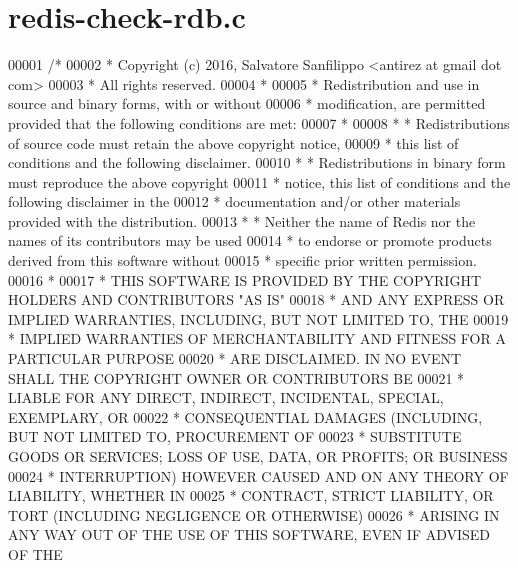 \hypertarget{redis-check-rdb_8c_source}{}\section{redis-\/check-\/rdb.c}
\label{redis-check-rdb_8c_source}

\begin{DoxyCode}
00001 \textcolor{comment}{/*}
00002 \textcolor{comment}{ * Copyright (c) 2016, Salvatore Sanfilippo <antirez at gmail dot com>}
00003 \textcolor{comment}{ * All rights reserved.}
00004 \textcolor{comment}{ *}
00005 \textcolor{comment}{ * Redistribution and use in source and binary forms, with or without}
00006 \textcolor{comment}{ * modification, are permitted provided that the following conditions are met:}
00007 \textcolor{comment}{ *}
00008 \textcolor{comment}{ *   * Redistributions of source code must retain the above copyright notice,}
00009 \textcolor{comment}{ *     this list of conditions and the following disclaimer.}
00010 \textcolor{comment}{ *   * Redistributions in binary form must reproduce the above copyright}
00011 \textcolor{comment}{ *     notice, this list of conditions and the following disclaimer in the}
00012 \textcolor{comment}{ *     documentation and/or other materials provided with the distribution.}
00013 \textcolor{comment}{ *   * Neither the name of Redis nor the names of its contributors may be used}
00014 \textcolor{comment}{ *     to endorse or promote products derived from this software without}
00015 \textcolor{comment}{ *     specific prior written permission.}
00016 \textcolor{comment}{ *}
00017 \textcolor{comment}{ * THIS SOFTWARE IS PROVIDED BY THE COPYRIGHT HOLDERS AND CONTRIBUTORS "AS IS"}
00018 \textcolor{comment}{ * AND ANY EXPRESS OR IMPLIED WARRANTIES, INCLUDING, BUT NOT LIMITED TO, THE}
00019 \textcolor{comment}{ * IMPLIED WARRANTIES OF MERCHANTABILITY AND FITNESS FOR A PARTICULAR PURPOSE}
00020 \textcolor{comment}{ * ARE DISCLAIMED. IN NO EVENT SHALL THE COPYRIGHT OWNER OR CONTRIBUTORS BE}
00021 \textcolor{comment}{ * LIABLE FOR ANY DIRECT, INDIRECT, INCIDENTAL, SPECIAL, EXEMPLARY, OR}
00022 \textcolor{comment}{ * CONSEQUENTIAL DAMAGES (INCLUDING, BUT NOT LIMITED TO, PROCUREMENT OF}
00023 \textcolor{comment}{ * SUBSTITUTE GOODS OR SERVICES; LOSS OF USE, DATA, OR PROFITS; OR BUSINESS}
00024 \textcolor{comment}{ * INTERRUPTION) HOWEVER CAUSED AND ON ANY THEORY OF LIABILITY, WHETHER IN}
00025 \textcolor{comment}{ * CONTRACT, STRICT LIABILITY, OR TORT (INCLUDING NEGLIGENCE OR OTHERWISE)}
00026 \textcolor{comment}{ * ARISING IN ANY WAY OUT OF THE USE OF THIS SOFTWARE, EVEN IF ADVISED OF THE}

\end{DoxyCode}
